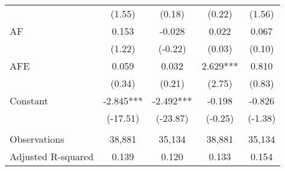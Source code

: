 \begin{table}[H]
\begin{center}
\begin{tabular}{lcccc}
			& (1.55) & (0.18) & (0.22) & (1.56) \\
			AF & 0.153 & -0.028 & 0.022 & 0.067 \\
			& (1.22) & (-0.22) & (0.03) & (0.10) \\
			AFE & 0.059 & 0.032 & 2.629*** & 0.810 \\
			& (0.34) & (0.21) & (2.75) & (0.83) \\
			Constant & -2.845*** & -2.492*** & -0.198 & -0.826 \\
			& (-17.51) & (-23.87) & (-0.25) & (-1.38) \\
			&   &   &   &  \\
			Observations & 38,881 & 35,134 & 38,881 & 35,134 \\
			Adjusted R-squared & 0.139 & 0.120 & 0.133 & 0.154 \\
			\bottomrule
			\bottomrule
		\end{tabular}%
	\end{center}
\end{table}%